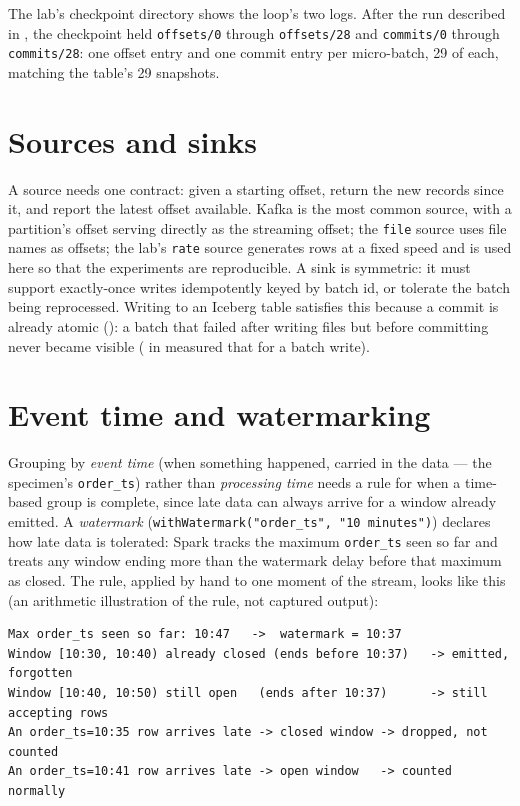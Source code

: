 The lab's checkpoint directory shows the loop's two logs. After the run described in
, the checkpoint held \texttt{offsets/0} through
\texttt{offsets/28} and \texttt{commits/0} through \texttt{commits/28}: one offset
entry and one commit entry per micro-batch, 29 of each, matching the table's 29
snapshots.

\section{Sources and sinks}
\label{sec:stream-sources-sinks}

A source needs one contract: given a starting offset, return the new records since
it, and report the latest offset available. Kafka is the most common source, with a
partition's offset serving directly as the streaming offset; the \texttt{file}
source uses file names as offsets; the lab's \texttt{rate} source generates rows at
a fixed speed and is used here so that the experiments are reproducible. A sink is
symmetric: it must support exactly-once writes idempotently keyed by batch id, or
tolerate the batch being reprocessed. Writing to an Iceberg table satisfies this
because a commit is already atomic (): a batch that
failed after writing files but before committing never became visible
( in  measured that for a batch write).

\section{Event time and watermarking}
\label{sec:stream-watermark}

Grouping by \emph{event time} (when something happened, carried in the data --- the
specimen's \texttt{order\_ts}) rather than \emph{processing time} needs a rule for
when a time-based group is complete, since late data can always arrive for a window
already emitted. A \emph{watermark} (\texttt{withWatermark("order\_ts", "10
minutes")}) declares how late data is tolerated: Spark tracks the maximum
\texttt{order\_ts} seen so far and treats any window ending more than the watermark
delay before that maximum as closed. The rule, applied by hand to one moment of the
stream, looks like this (an arithmetic illustration of the rule, not captured
output):

\begin{lstlisting}[language=text,numbers=none,caption={Which orders close a 10-minute window, and which arrive too late (illustration of the rule)},captionpos=b,label=lst:stream-watermark-rule]
Max order_ts seen so far: 10:47   ->  watermark = 10:37
Window [10:30, 10:40) already closed (ends before 10:37)   -> emitted, forgotten
Window [10:40, 10:50) still open   (ends after 10:37)      -> still accepting rows
An order_ts=10:35 row arrives late -> closed window -> dropped, not counted
An order_ts=10:41 row arrives late -> open window   -> counted normally
\end{lstlisting}

